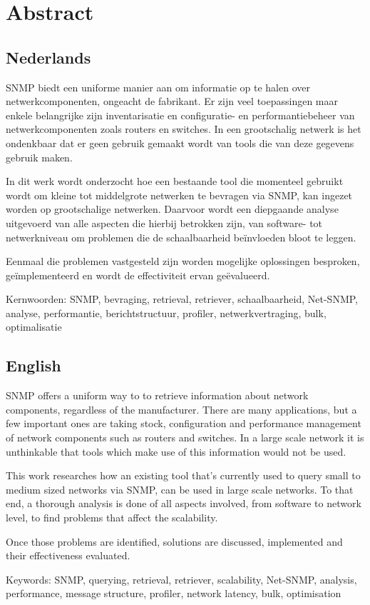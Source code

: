 \chapter*{Abstract}

\section*{Nederlands}

SNMP biedt een uniforme manier aan om informatie op te halen over netwerkcomponenten, ongeacht de fabrikant.
Er zijn veel toepassingen maar enkele belangrijke zijn inventarisatie en configuratie- en performantiebeheer van netwerkcomponenten zoals routers en switches.
In een grootschalig netwerk is het ondenkbaar dat er geen gebruik gemaakt wordt van tools die van deze gegevens gebruik maken.

In dit werk wordt onderzocht hoe een bestaande tool die momenteel gebruikt wordt om kleine tot middelgrote netwerken te bevragen via SNMP,
kan ingezet worden op grootschalige netwerken.
Daarvoor wordt een diepgaande analyse uitgevoerd van alle aspecten die hierbij betrokken zijn,
van software- tot netwerkniveau om problemen die de schaalbaarheid beïnvloeden bloot te leggen.

Eenmaal die problemen vastgesteld zijn worden mogelijke oplossingen besproken, geïmplementeerd en wordt de effectiviteit ervan geëvalueerd.


Kernwoorden: SNMP, bevraging, retrieval, retriever, schaalbaarheid, Net-SNMP, analyse, performantie, berichtstructuur, profiler, netwerkvertraging, bulk, optimalisatie


\section*{English}

SNMP offers a uniform way to to retrieve information about network components, regardless of the manufacturer.
There are many applications, but a few important ones are taking stock, configuration and performance management of network components such as routers and switches.
In a large scale network it is unthinkable that tools which make use of this information would not be used.

This work researches how an existing tool that's currently used to query small to medium sized networks via SNMP,
can be used in large scale networks.
To that end, a thorough analysis is done of all aspects involved, from software to network level, to find problems that affect the scalability.

Once those problems are identified, solutions are discussed, implemented and their effectiveness evaluated.


Keywords: SNMP, querying, retrieval, retriever, scalability, Net-SNMP, analysis, performance, message structure, profiler, network latency, bulk, optimisation